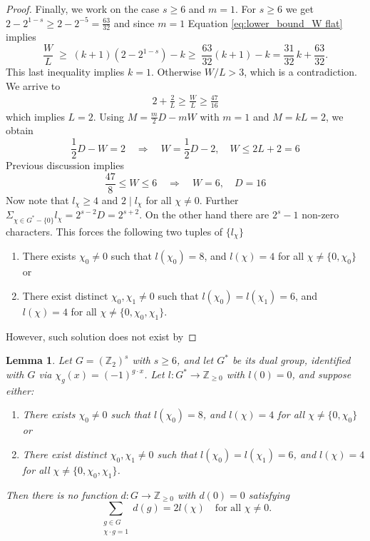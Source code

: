 \documentclass[12pt,twoside,]{amsart}
\theoremstyle{plain}
\newtheorem{lemma}[theorem]{Lemma}
\theoremstyle{definition}
\begin{document}
\begin{proof}
Finally, we work on the case $s \geq 6$ and $m=1$.  
For $s\ge 6$ we get $2-2^{1-s}\ge 2-2^{-5}=\tfrac{63}{32}$ and since $m=1$
Equation \eqref{eq:lower_bound_W flat} implies
\[
\frac{W}{L}\;\ge\;(k+1)\!\left(2-2^{1-s}\right)-k
\ge\;\frac{63}{32}(k+1)-k
=\frac{31}{32}\,k+\frac{63}{32}.
\]
This last inequality implies $k=1$. Otherwise $W/L > 3$, which is a contradiction. 
We arrive to 
\begin{align*}
 2 + \frac{2}{L} \geq \frac{W}{L} \geq   \frac{47}{16}
\end{align*}
which implies $L =2$. Using $M=\frac{m}{2}D-mW$ with $m=1$ and $M=kL=2$, we obtain
\[
\frac{1}{2}D-W=2\quad\Longrightarrow\quad W=\frac{1}{2}D-2, \quad W\le 2L+2=6
\]
Previous discussion implies
\[
\frac{47}{8} \leq W \leq 6
\quad\Longrightarrow\quad
W=6, \quad D = 16 
\]
Now note that $l_{\chi} \geq 4$ and $2 \mid l_{\chi}$ for all $\chi \neq 0$. Further $\Sigma_{\chi \in G^* -\{0\}} l_{\chi} = 2^{s-2}D = 2^{s+2}$. On the other hand there are $2^s-1$ non-zero characters. This forces the following two tuples of $\{l_{\chi}\}$
\begin{enumerate}
    \item There exists \( \chi_0 \neq 0 \) such that \( l(\chi_0) = 8 \), and \( l(\chi) = 4 \) for all \( \chi \neq \{0, \chi_0\} \) or
    \item There exist distinct \( \chi_0, \chi_1 \neq 0 \) such that \( l(\chi_0) = l(\chi_1) = 6 \), and \( l(\chi) = 4 \) for all \( \chi \neq \{0, \chi_0, \chi_1\} \).
\end{enumerate}
However, such solution does not exist by 

\end{proof}

\begin{lemma} \label{lemma: nonexistence for s6}
Let \( G = (\mathbb{Z}_2)^s \) with \( s \ge 6 \), and let \( G^* \) be its dual group, identified with \( G \) via \( \chi_g(x) = (-1)^{g \cdot x} \).  
Let \( l: G^* \to \mathbb{Z}_{\ge 0} \) with \( l(0) = 0 \), and suppose either:
\begin{enumerate}
    \item There exists \( \chi_0 \neq 0 \) such that \( l(\chi_0) = 8 \), and \( l(\chi) = 4 \) for all \( \chi \neq \{0, \chi_0\} \) or
    \item There exist distinct \( \chi_0, \chi_1 \neq 0 \) such that \( l(\chi_0) = l(\chi_1) = 6 \), and \( l(\chi) = 4 \) for all \( \chi \neq \{0, \chi_0, \chi_1\} \).
\end{enumerate}

Then there is no function \( d: G \to \mathbb{Z}_{\ge 0} \) with \( d(0) = 0 \) satisfying
\[
\sum_{\substack{g \in G \\ \chi \cdot g = 1}} d(g) = 2 l(\chi) \quad \text{for all } \chi \neq 0.
\]

\end{lemma}
\end{document}
